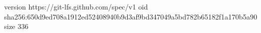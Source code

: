 version https://git-lfs.github.com/spec/v1
oid sha256:650d9ed708a1912ed52408940b9d3af9bd347049a5bd782b65182f1a170b5a90
size 336
